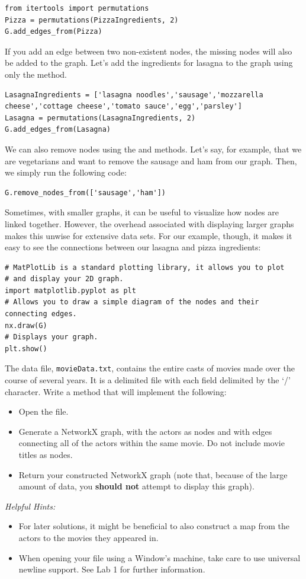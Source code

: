 \begin{lstlisting}
from itertools import permutations
Pizza = permutations(PizzaIngredients, 2)
G.add_edges_from(Pizza)
\end{lstlisting}
If you add an edge between two non-existent nodes, the missing nodes will also be added to the graph. Let's add the ingredients for lasagna to the graph using only the  method.
\begin{lstlisting}
LasagnaIngredients = ['lasagna noodles','sausage','mozzarella cheese','cottage cheese','tomato sauce','egg','parsley']
Lasagna = permutations(LasagnaIngredients, 2)
G.add_edges_from(Lasagna)
\end{lstlisting}
We can also remove nodes using the  and  methods. Let's say, for example, that we are vegetarians and want to remove the sausage and ham from our graph. Then, we simply run the following code:
\begin{lstlisting}
G.remove_nodes_from(['sausage','ham'])
\end{lstlisting}

Sometimes, with smaller graphs, it can be useful to visualize how nodes are linked together. However, the overhead associated with displaying larger graphs makes this unwise for extensive data sets.
For our example, though, it makes it easy to see the connections between our lasagna and pizza ingredients:

\begin{lstlisting}
# MatPlotLib is a standard plotting library, it allows you to plot
# and display your 2D graph.
import matplotlib.pyplot as plt
# Allows you to draw a simple diagram of the nodes and their connecting edges.
nx.draw(G)
# Displays your graph.
plt.show()
\end{lstlisting}


\begin{problem}
The data file, \texttt{movieData.txt}, contains the entire casts of movies made over the course of several years. It is a delimited file with each field delimited by the `/' character. Write a method that will implement the following:
\begin{itemize}
\item Open the file.
\item Generate a NetworkX graph, with the actors as nodes and with edges connecting all of the actors within the same movie. Do not include movie titles as nodes.
\item Return your constructed NetworkX graph (note that, because of the large amount of data, you \textbf{should not} attempt to display this graph).
\end{itemize}
\emph{Helpful Hints:}
\begin{itemize}
\item For later solutions, it might be beneficial to also construct a map from the actors to the movies they appeared in.
\item When opening your file using a Window's machine, take care to use universal newline support. See Lab 1 for further information.
\end{itemize}
\end{problem}

